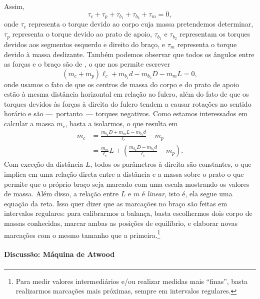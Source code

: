 Assim,
\begin{equation}
    \tau_c + \tau_p + \tau_{b_1} + \tau_{b_2} + \tau_m = 0,
\end{equation}
%
onde $\tau_c$ representa o torque devido ao corpo cuja massa pretendemos determinar, $\tau_p$ representa o torque devido ao prato de apoio, $\tau_{b_1}$ e $\tau_{b_2}$ representam os torques devidos aos segmentos esquerdo e direito do braço, e $\tau_m$ representa o torque devido à massa deslizante. Também podemos observar que todos os ângulos entre as forças e o braço são de , o que nos permite escrever
\begin{equation}
    (m_c + m_p) \ell_c + m_{b_1} d - m_{b_2} D - m_m L = 0,
\end{equation}
%
onde usamos o fato de que os centros de massa do corpo e do prato de apoio estão à mesma distância horizontal em relação ao fulcro, além do fato de que os torques devidos às forças à direita do fulcro tendem a causar rotações no sentido horário e são ---~portanto~--- torques negativos. Como estamos interessados em calcular a massa $m_c$, basta a isolarmos, o que resulta em
\begin{align}
    m_c &= \frac{m_{b_2} D + m_m L - m_{b_1}d}{\ell_c} - m_p\\
    &= \frac{m_{m}}{\ell_c} L + \left(\frac{m_{b_2} D - m_{b_1}d}{\ell_c} - m_p\right).
\end{align}
%
Com exceção da distância $L$, todos os parâmetros à direita são constantes, o que implica em uma relação direta entre a distância e a massa sobre o prato o que permite que o próprio braço seja marcado com uma escala mostrando os valores de massa. Além disso, a relação entre $L$ e $m$ é \emph{linear}, isto é, ela segue uma equação da reta. Isso quer dizer que as marcações no braço são feitas em intervalos regulares: para calibrarmos a balança, basta escolhermos dois corpo de massas conhecidas, marcar ambas as posições de equilíbrio, e elaborar novas marcações com o mesmo tamanho que a primeira.\footnote[][-2cm]{Para medir valores intermediários e/ou realizar medidas mais ``finas'', basta realizarmos marcações mais próximas, sempre em intervalos regulares.}

\paragraph{Discussão: Máquina de Atwood}
\label{Par:AcelMaqAtwood}

